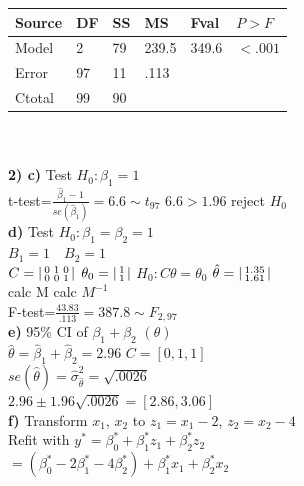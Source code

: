\documentclass[10pt,landscape]{article}
\newenvironment{lsmallmatrix}
{\left|\begin{smallmatrix}}
	{\end{smallmatrix}\right|}
\newcommand{\B}{\beta}
\newcommand{\sg}{\sigma}
\newcommand{\hb}{\hat{\beta}}
\newcommand{\hth}{\hat{\theta}}
\begin{document}
\begin{multicols*}{4}
{\begin{tabular}{l|l|l|l|l|l}
	\hline
	Source&DF  &SS  & MS  & Fval & $P>F$  \\
	\hline
	Model&2  &79  &239.5  &349.6& $<.001$ \\
	\hline
	Error& 97 & 11  & .113 &  \\
	\hline
	Ctotal&99  &90 &  & \\
	\hline
\end{tabular}}\\
\\
\textbf{2) c)} Test $H_0:\B_1=1$\\
t-test=$\frac{\hb_1-1}{se(\hb_1)}=6.6\sim t_{97}$ $6.6>1.96$ reject $H_0$\\
\textbf{d)} Test $H_0:\B_1=\B_2=1$\\
$B_1=1 \quad B_2=1$ \\
$C=\begin{lsmallmatrix}
0&1&0\\
0&0&1
\end{lsmallmatrix}$ $\theta_0=\begin{lsmallmatrix}
1\\
1
\end{lsmallmatrix}$ $H_0:C\theta=\theta_0$ $\hat{\theta}=\begin{lsmallmatrix}
1.35\\
1.61
\end{lsmallmatrix}$\\
calc M \quad calc $M^{-1}$\\
F-test=$\frac{43.83}{.113}=387.8\sim F_{2,97}$\\
\textbf{e)} 95\% CI of $\B_1+\B_2$ $(\theta)$\\
$\hth=\hb_1+\hb_2=2.96$ $C=[0,1,1]$\\
$se(\hth)=\hat{\sg}^2_{\hth}=\sqrt{.0026}$\\
$2.96\pm 1.96\sqrt{.0026}=[2.86,3.06]$\\
\textbf{f)} Transform $x_1$, $x_2$ to $z_1=x_1-2$, $z_2=x_2-4$\\
Refit with $y^*=\B_0^*+\B_1^*z_1+\B_2^*z_2$\\
$=(\B_0^*-2\B_1^*-4\B_2^*)+\B_1^*x_1+\B_2^*x_2$\\

\end{multicols*}
\end{document}
